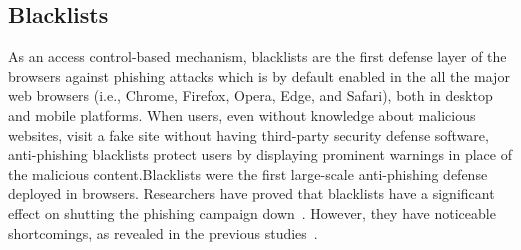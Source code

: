 

\subsection{Blacklists}

As an access control-based mechanism, blacklists are the first defense layer of the browsers against phishing attacks which is by default enabled in the all the major web browsers (i.e., Chrome, Firefox, Opera, Edge, and Safari), both in desktop and mobile platforms.
When users, even without knowledge about malicious websites, visit a fake site without having third-party security defense software, anti-phishing blacklists protect users by displaying prominent warnings in place of the malicious content.Blacklists were the first large-scale anti-phishing defense deployed in browsers. 
Researchers have proved that blacklists have a significant effect on shutting the phishing campaign down~\cite{sheng2009empirical}.
However, they have noticeable shortcomings, as revealed in the previous studies~\cite{oest2020sunrise}.

